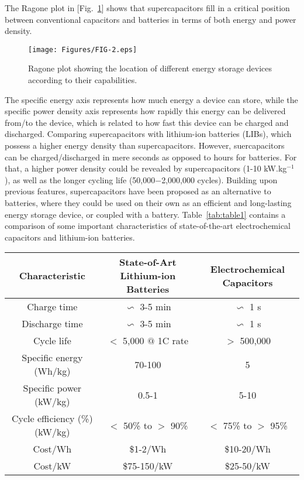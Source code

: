 \documentclass[reprint,amsmath,amssymb,aps,floatfix,
]{revtex4-2}
\begin{document}
The Ragone plot in [Fig.~\ref{fig:fig2}] shows that supercapacitors fill in a critical position between conventional capacitors and batteries in terms of both energy and power density. 
\begin{figure}[b]
    \centering
    \texttt{[image: Figures/FIG-2.eps]}
    \caption{\label{fig:fig2} Ragone plot showing the location of different energy storage devices according to their capabilities.}
    \end{figure}
The specific  energy axis represents how much energy a device can store, while the specific power density axis represents  how rapidly this energy can be delivered from/to the device, which is related to how fast this device can be charged and discharged.\cite{Simon2008} Comparing supercapacitors with lithium-ion batteries (LIBs), which possess a higher energy density than supercapacitors.\cite{Wang2012} However, suercapacitors can be charged/discharged in mere seconds as opposed to hours for batteries.\cite{Aurelien2003} For that, a higher power density could be revealed by supercapacitors (1-10 kW.kg$^{-1}$),\cite{González2016} as well as the longer cycling life (50,000$-$2,000,000 cycles).\cite{Aurelien2003} Building upon previous features, supercapacitors have been proposed as an alternative to batteries, where they could be used on their own as an efficient and long-lasting energy storage device, or coupled with a battery. Table~\ref{tab:table1} contains a comparison of some important characteristics of state-of-the-art electrochemical capacitors and lithium-ion batteries.
\begin{table*}
    \caption{\label{tab:table1}Comparison of some important characteristics of state-of-the-art electrochemical capacitors and lithium-ion batteries.}
    \begin{ruledtabular}
    \begin{tabular}{ccc}
    Characteristic&State-of-Art Lithium-ion Batteries&Electrochemical Capacitors\\ \hline

    Charge time&$\backsim$ 3-5 min & $\backsim$ 1 s \\
    Discharge time& $\backsim$ 3-5 min & $\backsim$ 1 s \\
    Cycle life & $<$ 5,000 $@$ 1C rate & $>$ 500,000 \\
    Specific energy (Wh/kg) & 70-100 & 5 \\
    Specific power (kW/kg) & 0.5-1 & 5-10  \\
    Cycle efficiency (\%) (kW/kg) & $<$ 50\% to $>$ 90\% & $<$ 75\% to $>$ 95\% \\
    Cost/Wh & \$1-2/Wh & \$10-20/Wh \\
    Cost/kW & \$75-150/kW & \$25-50/kW \\
    \end{tabular}
    \end{ruledtabular}
    \end{table*}
\end{document}
